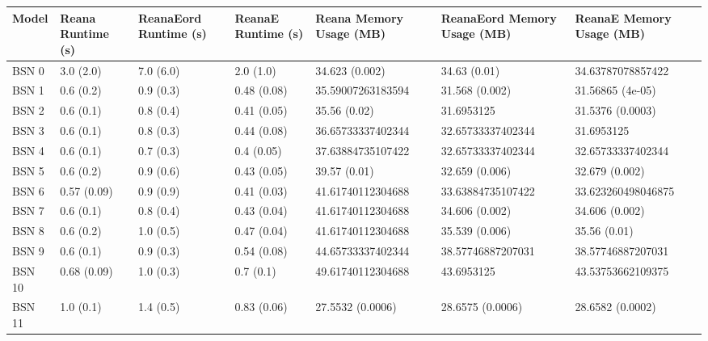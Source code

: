 \begin{tabular}{lllllll}
\toprule
 Model & Reana Runtime (s) & ReanaEord Runtime (s) & ReanaE Runtime (s) & Reana Memory Usage (MB) & ReanaEord Memory Usage (MB) & ReanaE Memory Usage (MB) \\
\midrule
 BSN 0 &         3.0 (2.0) &             7.0 (6.0) &          2.0 (1.0) &          34.623 (0.002) &                34.63 (0.01) &        34.63787078857422 \\
 BSN 1 &         0.6 (0.2) &             0.9 (0.3) &        0.48 (0.08) &       35.59007263183594 &              31.568 (0.002) &         31.56865 (4e-05) \\
 BSN 2 &         0.6 (0.1) &             0.8 (0.4) &        0.41 (0.05) &            35.56 (0.02) &                  31.6953125 &         31.5376 (0.0003) \\
 BSN 3 &         0.6 (0.1) &             0.8 (0.3) &        0.44 (0.08) &       36.65733337402344 &           32.65733337402344 &               31.6953125 \\
 BSN 4 &         0.6 (0.1) &             0.7 (0.3) &         0.4 (0.05) &       37.63884735107422 &           32.65733337402344 &        32.65733337402344 \\
 BSN 5 &         0.6 (0.2) &             0.9 (0.6) &        0.43 (0.05) &            39.57 (0.01) &              32.659 (0.006) &           32.679 (0.002) \\
 BSN 6 &       0.57 (0.09) &             0.9 (0.9) &        0.41 (0.03) &       41.61740112304688 &           33.63884735107422 &       33.623260498046875 \\
 BSN 7 &         0.6 (0.1) &             0.8 (0.4) &        0.43 (0.04) &       41.61740112304688 &              34.606 (0.002) &           34.606 (0.002) \\
 BSN 8 &         0.6 (0.2) &             1.0 (0.5) &        0.47 (0.04) &       41.61740112304688 &              35.539 (0.006) &             35.56 (0.01) \\
 BSN 9 &         0.6 (0.1) &             0.9 (0.3) &        0.54 (0.08) &       44.65733337402344 &           38.57746887207031 &        38.57746887207031 \\
BSN 10 &       0.68 (0.09) &             1.0 (0.3) &          0.7 (0.1) &       49.61740112304688 &                  43.6953125 &        43.53753662109375 \\
BSN 11 &         1.0 (0.1) &             1.4 (0.5) &        0.83 (0.06) &        27.5532 (0.0006) &            28.6575 (0.0006) &         28.6582 (0.0002) \\

\end{tabular}
